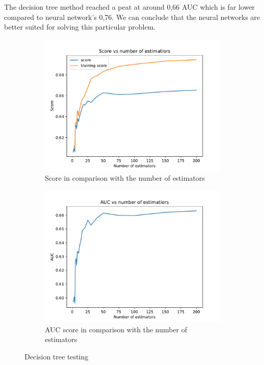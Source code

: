 \documentclass[12pt, a4paper]{article}
\begin{document}
The decision tree method reached a peat at around 0,66 AUC which is far lower compared to neural network's 0,76. We can conclude that the neural networks are better suited for solving this particular problem.

\begin{figure}[h!]
  \begin{subfigure}{0.5\textwidth}
  \includegraphics[width=\linewidth]{../graphs/bdt_score_estimators.pdf}
  \caption{Score in comparison with the number of estimators} \label{fig:a}
  \end{subfigure}
  \hspace*{\fill}
  \begin{subfigure}{0.5\textwidth}
  \includegraphics[width=\linewidth]{../graphs/bdt_auc_estimators.pdf}
  \caption{AUC score in comparison with the number of estimators} \label{fig:b}
  \end{subfigure}
  \caption{Decision tree testing} \label{fig:1}
\end{figure}
\end{document}
